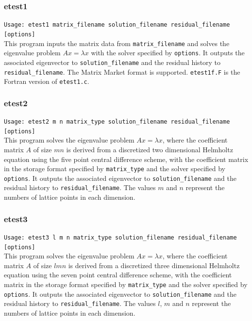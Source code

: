 \documentclass[a4paper]{article}
\begin{document}
\subsubsection{etest1}

\verb+Usage: etest1 matrix_filename solution_filename residual_filename [options]+\\

This program inputs the matrix data from {\tt matrix\_filename} and
solves the eigenvalue problem $Ax=\lambda x$ with 
the solver specified by {\tt options}. 
It outputs the associated eigenvector to 
{\tt solution\_filename} and the residual history to {\tt residual\_filename}. 
The Matrix Market format is supported. 
{\tt etest1f.F} is the Fortran version of {\tt etest1.c}.

\subsubsection{etest2}

\verb+Usage: etest2 m n matrix_type solution_filename residual_filename [options]+\\

This program solves the eigenvalue problem $Ax = \lambda x$, where the 
coefficient matrix $A$ of size $mn$ is derived from a discretized two dimensional Helmholtz equation using the five
point central difference scheme, with the coefficient matrix in the storage format specified
by \verb|matrix_type| and the solver specified by {\tt options}. 
It outputs the associated eigenvector to {\tt solution\_filename} and the residual history to {\tt residual\_filename}. 
The values $m$ and $n$ represent the numbers of lattice points
in each dimension. 

\subsubsection{etest3}

\verb+Usage: etest3 l m n matrix_type solution_filename residual_filename [options]+\\

This program solves the eigenvalue problem $Ax = \lambda x$, where the 
coefficient matrix $A$ of size $lmn$ is derived from a discretized three dimensional Helmholtz equation using the seven
point central difference scheme, with the coefficient matrix in the storage format specified
by \verb|matrix_type| and the solver specified by {\tt options}. 
It outputs the associated eigenvector to {\tt solution\_filename} and the residual history to {\tt residual\_filename}. 
The values $l$, $m$ and $n$ represent the numbers of lattice
points in each dimension. 
\end{document}
